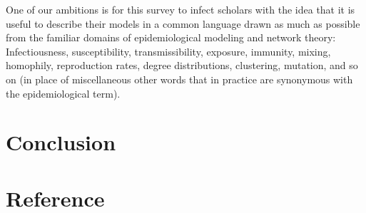 
One of our ambitions is for this survey to infect scholars with the idea that it is useful to describe their models in a common language drawn as much as possible from the familiar domains of epidemiological modeling and network theory:  Infectiousness, susceptibility, transmissibility, exposure, immunity, mixing, homophily, reproduction rates, degree distributions, clustering, mutation, and so on (in place of miscellaneous other words that in practice are synonymous with the epidemiological term).

\hypertarget{conclusion}{}
\section{Conclusion}




\section*{Reference}

\ifInBook{
  
  
}{
  \pagebreak
}
% 

\pagebreak

